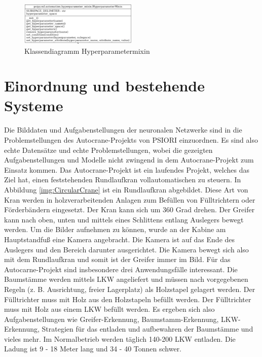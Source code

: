 	\begin{figure}[h]
		\centering
		\includegraphics[width=0.5\textwidth, center]{bilder/Klassendiagramme/Hyperparametermixin.png}
		\caption[Klassendiagramm Hyperparametermixin]{Klassendiagramm Hyperparametermixin}
		\label{img:KlassendiagrammHyperparametermixin}
	\end{figure}  
	
	\section{Einordnung und bestehende Systeme}
	\label{sec:BestehendesSystem}
	Die Bilddaten und Aufgabenstellungen der neuronalen Netzwerke sind in die Problemstellungen des Autocrane-Projekts von PSIORI einzuordnen. Es sind also echte Datensätze und echte Problemstellungen, wobei die gezeigten Aufgabenstellungen und Modelle nicht zwingend in dem Autocrane-Projekt zum Einsatz kommen. Das Autocrane-Projekt ist ein laufendes Projekt, welches das Ziel hat, einen feststehenden Rundlaufkran vollautomatischen zu steuern. In Abbildung \ref{img:CircularCrane} ist ein Rundlaufkran abgebildet. Diese Art von Kran werden in holzverarbeitenden Anlagen zum Befüllen von Fülltrichtern oder Förderbändern eingesetzt. Der Kran kann sich um 360 Grad drehen. Der Greifer kann nach oben, unten und mittels eines Schlittens entlang Auslegers bewegt werden. Um die Bilder aufnehmen zu können, wurde an der Kabine am Hauptstandfuß eine Kamera angebracht. Die Kamera ist auf das Ende des Auslegers und den Bereich darunter ausgerichtet. Die Kamera bewegt sich also mit dem Rundlaufkran und somit ist der Greifer immer im Bild. Für das Autocarne-Projekt sind insbesondere drei Anwendungsfälle interessant. Die Baumstämme werden mittels LKW angeliefert und müssen nach vorgegebenen Regeln (z. B. Ausrichtung, freier Lagerplatz) als Holzstapel gelagert werden. Der Fülltrichter muss mit Holz aus den Holzstapeln befüllt werden. Der Fülltrichter muss mit Holz aus einem LKW befüllt werden. Es ergeben sich also Aufgabenstellungen wie Greifer-Erkennung, Baumstamm-Erkennung, LKW-Erkennung, Strategien für das entladen und aufbewahren der Baumstämme und vieles mehr. Im Normalbetrieb werden täglich 140-200 LKW entladen. Die Ladung ist 9 - 18 Meter lang und 34 - 40 Tonnen schwer. \cite{PSIORIGmbH.2020}
